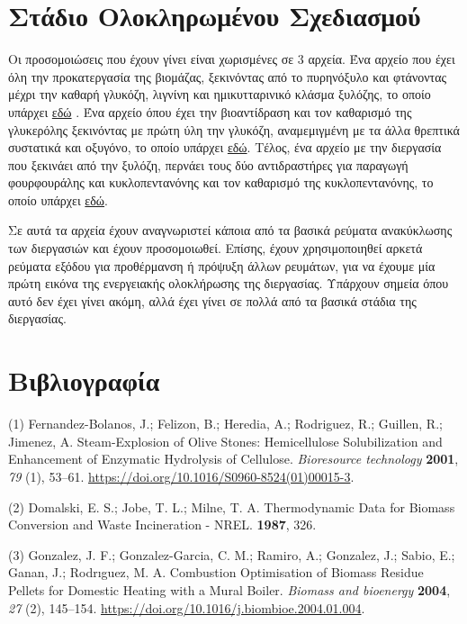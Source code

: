 \documentclass[11pt]{article}
\begin{document}
\section{Στάδιο Ολοκληρωμένου Σχεδιασμού}
\label{sec:orgc17372e}
Οι προσομοιώσεις που έχουν γίνει είναι χωρισμένες σε 3 αρχεία. Ένα αρχείο που έχει όλη την προκατεργασία της βιομάζας, ξεκινόντας από το πυρηνόξυλο και φτάνοντας μέχρι την καθαρή γλυκόζη, λιγνίνη και ημικυτταρινικό κλάσμα ξυλόζης, το οποίο υπάρχει \href{https://github.com/Vidianos-Giannitsis/Process-Design/blob/master/Aspen/olive\_kernel\_to\_glucose\_complete.apwz}{εδώ} . Ένα αρχείο όπου έχει την βιοαντίδραση και τον καθαρισμό της γλυκερόλης ξεκινόντας με πρώτη ύλη την γλυκόζη, αναμεμιγμένη με τα άλλα θρεπτικά συστατικά και οξυγόνο, το οποίο υπάρχει \href{https://github.com/Vidianos-Giannitsis/Process-Design/blob/master/Aspen/glucose\_to\_glycerol\_complete.apwz}{εδώ}. Τέλος, ένα αρχείο με την διεργασία που ξεκινάει από την ξυλόζη, περνάει τους δύο αντιδραστήρες για παραγωγή φουρφουράλης και κυκλοπεντανόνης και τον καθαρισμό της κυκλοπεντανόνης, το οποίο υπάρχει \href{https://github.com/Vidianos-Giannitsis/Process-Design/blob/master/Aspen/xylose\_to\_cyclopentanone\_complete.apwz}{εδώ}.

Σε αυτά τα αρχεία έχουν αναγνωριστεί κάποια από τα βασικά ρεύματα ανακύκλωσης των διεργασιών και έχουν προσομοιωθεί. Επίσης, έχουν χρησιμοποιηθεί αρκετά ρεύματα εξόδου για προθέρμανση ή πρόψυξη άλλων ρευμάτων, για να έχουμε μία πρώτη εικόνα της ενεργειακής ολοκλήρωσης της διεργασίας. Υπάρχουν σημεία όπου αυτό δεν έχει γίνει ακόμη, αλλά έχει γίνει σε πολλά από τα βασικά στάδια της διεργασίας.

\section{Βιβλιογραφία}
\label{sec:org799a4b1}
\hypertarget{citeproc_bib_item_1}{(1) Fernandez-Bolanos, J.; Felizon, B.; Heredia, A.; Rodriguez, R.; Guillen, R.; Jimenez, A. Steam-Explosion of Olive Stones: Hemicellulose Solubilization and Enhancement of Enzymatic Hydrolysis of Cellulose. \textit{Bioresource technology} \textbf{2001}, \textit{79} (1), 53–61. \url{https://doi.org/10.1016/S0960-8524(01)00015-3}.}

\hypertarget{citeproc_bib_item_2}{(2) Domalski, E. S.; Jobe, T. L.; Milne, T. A. Thermodynamic Data for Biomass Conversion and Waste Incineration - NREL. \textbf{1987}, 326.}

\hypertarget{citeproc_bib_item_3}{(3) Gonzalez, J. F.; Gonzalez-Garcia, C. M.; Ramiro, A.; Gonzalez, J.; Sabio, E.; Ganan, J.; Rodrıguez, M. A. Combustion Optimisation of Biomass Residue Pellets for Domestic Heating with a Mural Boiler. \textit{Biomass and bioenergy} \textbf{2004}, \textit{27} (2), 145–154. \url{https://doi.org/10.1016/j.biombioe.2004.01.004}.}
\end{document}
